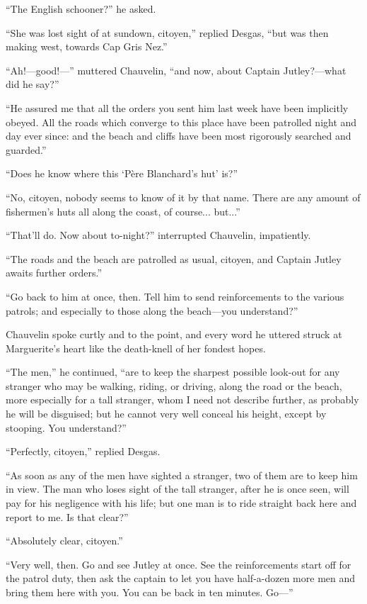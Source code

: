 \enquote{The English schooner?} he asked.

\enquote{She was lost sight of at sundown, citoyen,} replied Desgas, \enquote{but was then making west, towards Cap Gris Nez.}

\enquote{Ah!---good!---} muttered Chauvelin, \enquote{and now, about Captain Jutley?---what did he say?}

\enquote{He assured me that all the orders you sent him last week have been implicitly obeyed. All the roads which converge to this place have been patrolled night and day ever since: and the beach and cliffs have been most rigorously searched and guarded.}

\enquote{Does he know where this \enquote{Père Blanchard's hut} is?}

\enquote{No, citoyen, nobody seems to know of it by that name. There are any amount of fishermen's huts all along the coast, of course... but...}

\enquote{That'll do. Now about to-night?} interrupted Chauvelin, impatiently.

\enquote{The roads and the beach are patrolled as usual, citoyen, and Captain Jutley awaits further orders.}

\enquote{Go back to him at once, then. Tell him to send reinforcements to the various patrols; and especially to those along the beach---you understand?}

Chauvelin spoke curtly and to the point, and every word he uttered struck at Marguerite's heart like the death-knell of her fondest hopes.

\enquote{The men,} he continued, \enquote{are to keep the sharpest possible look-out for any stranger who may be walking, riding, or driving, along the road or the beach, more especially for a tall stranger, whom I need not describe further, as probably he will be disguised; but he cannot very well conceal his height, except by stooping. You understand?}

\enquote{Perfectly, citoyen,} replied Desgas.

\enquote{As soon as any of the men have sighted a stranger, two of them are to keep him in view. The man who loses sight of the tall stranger, after he is once seen, will pay for his negligence with his life; but one man is to ride straight back here and report to me. Is that clear?}

\enquote{Absolutely clear, citoyen.}

\enquote{Very well, then. Go and see Jutley at once. See the reinforcements start off for the patrol duty, then ask the captain to let you have half-a-dozen more men and bring them here with you. You can be back in ten minutes. Go---}

